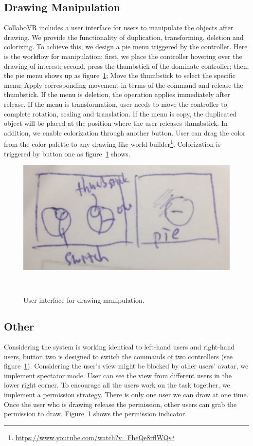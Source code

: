 \documentclass{sigchi}
\begin{document}
\subsection{Drawing Manipulation}
CollaboVR includes a user interface for users to manipulate the objects after drawing. We provide the functionality of duplication, transforming, deletion and colorizing. To achieve this, we design a pie menu triggered by the controller. Here is the workflow for manipulation: first, we place the controller hovering over the drawing of interest; second, press the thumbstick of the dominate controller; then, the pie menu shows up as figure~\ref{fig:userinterface}; Move the thumbstick to select the specific menu; Apply corresponding movement in terms of the command and release the thumbstick. If the menu is deletion, the operation applies immediately after release. If the menu is transformation, user needs to move the controller to complete rotation, scaling and translation. If the menu is copy, the duplicated object will be placed at the position where the user releases thumbstick. In addition, we enable colorization through another button. User can drag the color from the color palette to any drawing like world builder\footnote{\url{https://www.youtube.com/watch?v=FheQe8rflWQ}}. Colorization is triggered by button one as figure~\ref{fig:userinterface} shows. 

\begin{figure}[tb!]
 \centering
 \includegraphics[width=0.9\columnwidth]{userinterface.jpg}
 \caption{User interface for drawing manipulation.
 }~\label{fig:userinterface}
\end{figure}

\subsection{Other}
Considering the system is working identical to left-hand users and right-hand users, button two is designed to switch the commands of two controllers (see figure~\ref{fig:userinterface}). Considering the user's view might be blocked by other users' avatar, we implement spectator mode. User can see the view from different users in the lower right corner. To encourage all the users work on the task together, we implement a permission strategy. There is only one user we can draw at one time. Once the user who is drawing release the permission, other users can grab the permission to draw. Figure~\ref{fig:userinterface} shows the permission indicator.
\end{document}
